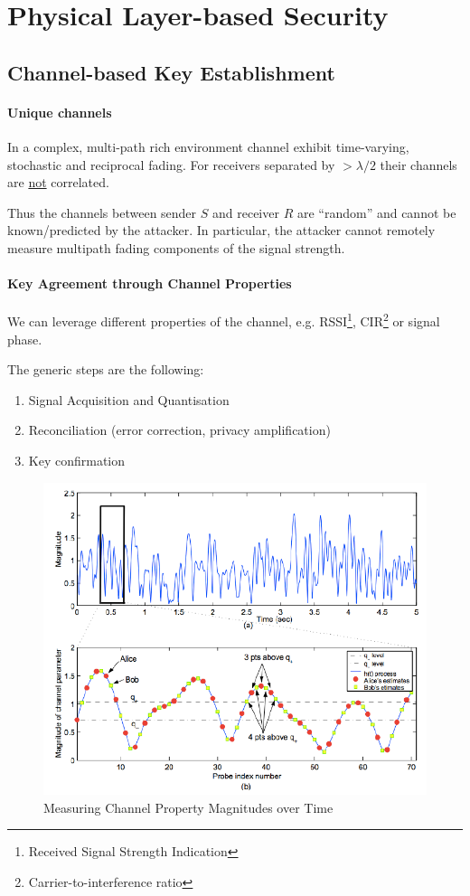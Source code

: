 \section{Physical Layer-based Security}


\subsection{Channel-based Key Establishment}

\paragraph{Unique channels}
In a complex, multi-path rich environment channel exhibit time-varying, stochastic and reciprocal fading.
For receivers separated by $> \lambda / 2$ their channels are \underline{not} correlated.

Thus the channels between sender $S$ and receiver $R$ are ``random'' and cannot be known/predicted by the attacker.
In particular, the attacker cannot remotely measure multipath fading components of the signal strength.

\paragraph{Key Agreement through Channel Properties}
We can leverage different properties of the channel, e.g. RSSI\footnote{Received Signal Strength Indication}, CIR\footnote{Carrier-to-interference ratio} or signal phase.

The generic steps are the following:
\begin{enumerate}
	\item Signal Acquisition and Quantisation
	\item Reconciliation (error correction, privacy amplification)
	\item Key confirmation
\end{enumerate}

\begin{figure}
	\centering
	\includegraphics[scale=0.5]{images/7-channel-property.png}
	\caption{Measuring Channel Property Magnitudes over Time}
	\label{fig:channel-property}
\end{figure}

